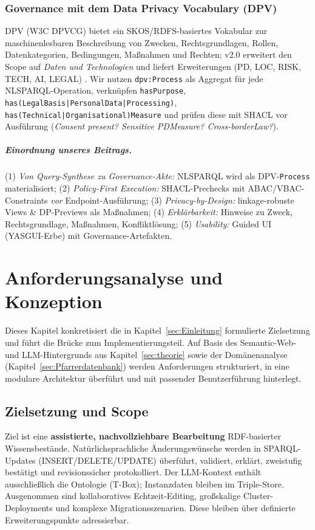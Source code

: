 \subsection{Governance mit dem Data Privacy Vocabulary (DPV)}
DPV (W3C DPVCG) bietet ein SKOS/RDFS-basiertes Vokabular zur maschinenlesbaren Beschreibung von Zwecken, Rechtsgrundlagen, Rollen, Datenkategorien, Bedingungen, Maßnahmen und Rechten; v2.0 erweitert den Scope auf \emph{Daten und Technologien} und liefert Erweiterungen (PD, LOC, RISK, TECH, AI, LEGAL) \cite{dpv2024w3c}. 
Wir nutzen \texttt{dpv:Process} als Aggregat für jede NL{\textrightarrow}SPARQL-Operation, verknüpfen \texttt{hasPurpose}, \texttt{has(LegalBasis|PersonalData|Processing)}, \texttt{has(Technical|Organisational)Measure} und prüfen diese mit SHACL vor Ausführung (\emph{Consent present? Sensitive PD{\textrightarrow}Measure? Cross-border{\textrightarrow}Law?}).

\paragraph{Einordnung unseres Beitrags.}
(1) \emph{Von Query-Synthese zu Governance-Akte:} NL{\textrightarrow}SPARQL wird als DPV-\texttt{Process} materialisiert; (2) \emph{Policy-First Execution:} SHACL-Prechecks mit ABAC/VBAC-Constraints \emph{vor} Endpoint-Ausführung; (3) \emph{Privacy-by-Design:} linkage-robuste Views \& DP-Previews als Maßnahmen; (4) \emph{Erklärbarkeit:} Hinweise zu Zweck, Rechtsgrundlage, Maßnahmen, Konfliktlösung; (5) \emph{Usability:} Guided UI (YASGUI-Erbe) mit Governance-Artefakten.




\chapter{Anforderungsanalyse und Konzeption}
\label{sec:konzeption}

Dieses Kapitel konkretisiert die in Kapitel~\ref{sec:Einleitung} formulierte Zielsetzung und führt die Brücke zum Implementierungsteil. Auf Basis des Semantic-Web- und LLM-Hintergrunds aus Kapitel~\ref{sec:theorie} sowie der Domänenanalyse (Kapitel~\ref{sec:Pfarrerdatenbank}) werden Anforderungen strukturiert, in eine modulare Architektur überführt und mit passender Benutzerführung hinterlegt.

\section{Zielsetzung und Scope}
Ziel ist eine \textbf{assistierte, nachvollziehbare Bearbeitung} RDF-basierter Wissensbestände. Natürlichsprachliche Änderungswünsche werden in SPARQL-Updates (INSERT/DELETE/UPDATE) überführt, validiert, erklärt, zweistufig bestätigt und revisionssicher protokolliert. Der LLM-Kontext enthält ausschließlich die Ontologie (T-Box); Instanzdaten bleiben im Triple-Store. Ausgenommen sind kollaboratives Echtzeit-Editing, großskalige Cluster-Deployments und komplexe Migrationsszenarien. Diese bleiben über definierte Erweiterungspunkte adressierbar.

